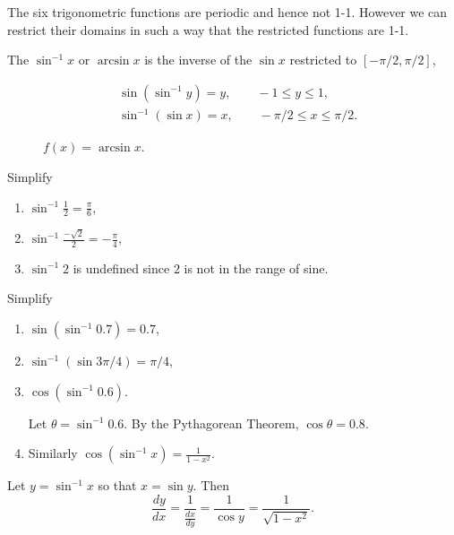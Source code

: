 \documentclass[../calc1-main.tex]{subfiles}
\begin{document}
The six trigonometric functions are periodic and hence not 1-1. However we can restrict their domains in such a way that the restricted functions are 1-1.

\begin{minipage}{0.5\textwidth}
  The $\sin^{-1}x$ or $\arcsin x$ is the inverse of the $\sin x$ restricted to $[-\pi/2, \pi/2]$,

  \begin{align*}
    & \sin (\sin^{-1} y) = y, \qquad -1 \le y \le 1, \\
    & \sin^{-1} (\sin x) = x, \qquad -\pi/2 \le x \le \pi/2.
  \end{align*}
\end{minipage}%
\begin{minipage}{0.5\textwidth}
  \begin{figure}[H]
    \centering
    
    \caption{$f(x) = \arcsin x$.}
  \end{figure}
\end{minipage}

\begin{example}
  Simplify
  \begin{enumerate}
    \item $\sin^{-1} \frac{1}{2} = \frac{\pi}{6}$,
    \item $\sin^{-1} \frac{-\sqrt{2}}{2} = -\frac{\pi}{4}$,
    \item $\sin^{-1} 2$ is undefined since $2$ is not in the range of sine.
  \end{enumerate}
\end{example}

\begin{example}
  Simplify
  \begin{enumerate}
    \item $\sin(\sin^{-1} 0.7) = 0.7$,
    \item $\sin^{-1}(\sin 3 \pi/4) = \pi/4$,
    \item $\cos (\sin^{-1} 0.6)$.
    \begin{solution}
      Let $\theta=\sin^{-1} 0.6$. By the Pythagorean Theorem, $\cos \theta = 0.8$.
    \end{solution}
    \item Similarly $\cos (\sin^{-1} x) = \frac{1}{1-x^2}$.
  \end{enumerate}
\end{example}

Let $y = \sin^{-1} x$ so that $x = \sin y$. Then
\[
  \frac{dy}{dx} = \frac{1}{\frac{dx}{dy}} = \frac{1}{\cos y} = \frac{1}{\sqrt{1-x^2}}.
\]
\end{document}
